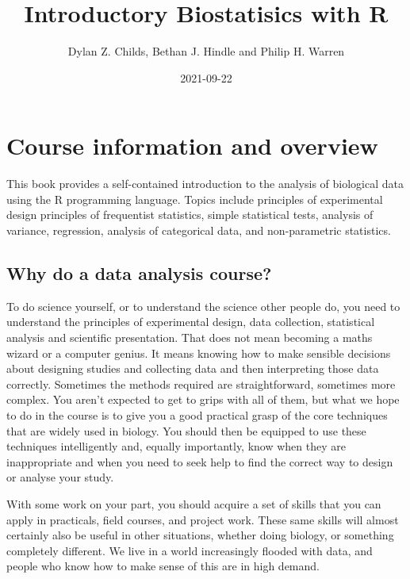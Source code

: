 \documentclass[
]{book}
\title{Introductory Biostatisics with R}
\author{Dylan Z. Childs, Bethan J. Hindle and Philip H. Warren}
\date{2021-09-22}
\begin{document}
\maketitle

{
\setcounter{tocdepth}{1}
\tableofcontents
}
\hypertarget{course-information-and-overview}{%
\chapter*{Course information and overview}\label{course-information-and-overview}}

This book provides a self-contained introduction to the analysis of biological data using the R programming language. Topics include principles of experimental design principles of frequentist statistics, simple statistical tests, analysis of variance, regression, analysis of categorical data, and non-parametric statistics.

\hypertarget{why-do-a-data-analysis-course}{%
\section*{Why do a data analysis course?}\label{why-do-a-data-analysis-course}}

To do science yourself, or to understand the science other people do, you need to understand the principles of experimental design, data collection, statistical analysis and scientific presentation. That does not mean becoming a maths wizard or a computer genius. It means knowing how to make sensible decisions about designing studies and collecting data and then interpreting those data correctly. Sometimes the methods required are straightforward, sometimes more complex. You aren't expected to get to grips with all of them, but what we hope to do in the course is to give you a good practical grasp of the core techniques that are widely used in biology. You should then be equipped to use these techniques intelligently and, equally importantly, know when they are inappropriate and when you need to seek help to find the correct way to design or analyse your study.

With some work on your part, you should acquire a set of skills that you can apply in practicals, field courses, and project work. These same skills will almost certainly also be useful in other situations, whether doing biology, or something completely different. We live in a world increasingly flooded with data, and people who know how to make sense of this are in high demand.
\end{document}

